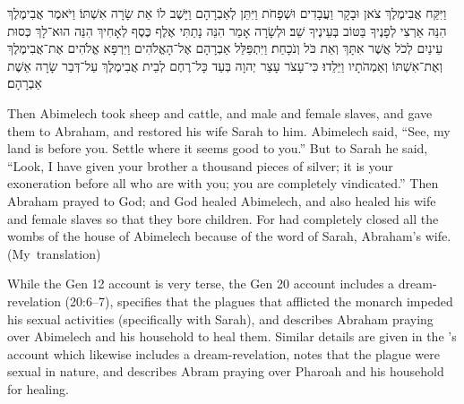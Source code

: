 \begin{hebrewtranslation}
    וַיִּקַּח אֲבִימֶלֶךְ צֹאן וּבָקָר וַעֲבָדִים וּשְׁפָחֹת וַיִּתֵּן לְאַבְרָהָם וַיָּשֶׁב לוֹ אֵת שָׂרָה אִשְׁתּוֹ׃
    וַיֹּאמֶר אֲבִימֶלֶךְ הִנֵּה אַרְצִי לְפָנֶיךָ בַּטּוֹב בְּעֵינֶיךָ שֵׁב׃
    וּלְשָׂרָה אָמַר הִנֵּה נָתַתִּי אֶלֶף כֶּסֶף לְאָחִיךְ הִנֵּה הוּא־לָךְ כְּסוּת עֵינַיִם לְכֹל אֲשֶׁר אִתָּךְ וְאֵת כֹּל וְנֹכָחַת׃
    וַיִּתְפַּלֵּל אַבְרָהָם אֶל־הָאֱלֹהִים וַיִּרְפָּא אֱלֹהִים אֶת־אֲבִימֶלֶךְ וְאֶת־אִשְׁתּוֹ וְאַמְהֹתָיו וַיֵּלֵדוּ׃
    כִּי־עָצֹר עָצַר יְהוָה בְּעַד כָּל־רֶחֶם לְבֵית אֲבִימֶלֶךְ עַל־דְּבַר שָׂרָה אֵשֶׁת אַבְרָהָם׃  
\end{hebrewtranslation}

\begin{translation}
    Then Abimelech took sheep and cattle, and male and female slaves, and gave them to Abraham, and restored his wife Sarah to him.
    Abimelech said, ``See, my land is before you. Settle where it seems good to you.'' 
    But to Sarah he said, ``Look, I have given your brother a thousand pieces of silver; it is your exoneration before all who are with you; you are completely vindicated.'' 
    Then Abraham prayed to God; and God healed Abimelech, and also healed his wife and female slaves so that they bore children. 
    For \yahweh had completely closed all the wombs of the house of Abimelech because of the word of Sarah, Abraham's wife. (My~translation)
\end{translation}

While the Gen 12 account is very terse, the Gen 20 account includes a dream-revelation (20:6--7), specifies that the plagues that afflicted the monarch impeded his sexual activities (specifically with Sarah), and describes Abraham praying over Abimelech and his household to heal them. Similar details are given in the \ga's account which likewise includes a dream-revelation, notes that the plague were sexual in nature, and describes Abram praying over Pharoah and his household for healing. 


